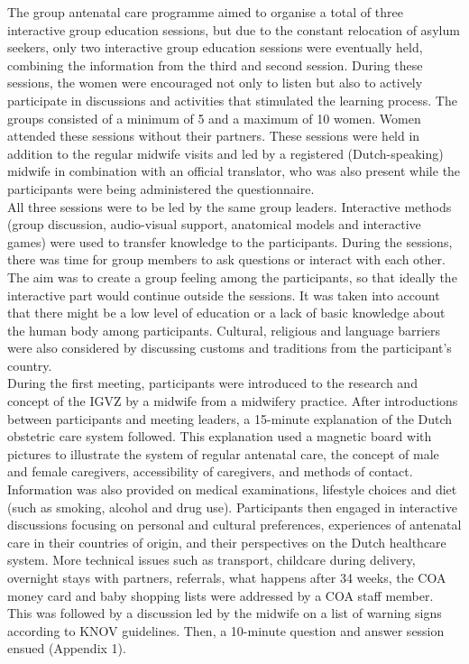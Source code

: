 \documentclass[12pt]{article}
\begin{document}
\noindent The group antenatal care programme aimed to organise a total of three interactive group education sessions, but due to the constant relocation of asylum seekers, only two interactive group education sessions were eventually held, combining the information from the third and second session. During these sessions, the women were encouraged not only to listen but also to actively participate in discussions and activities that stimulated the learning process. The groups consisted of a minimum of 5 and a maximum of 10 women. Women attended these sessions without their partners. These sessions were held in addition to the regular midwife visits and  led by a registered (Dutch-speaking) midwife in combination with an official translator, who was also present while the participants were being administered the questionnaire. \\

\noindent All three sessions were to be led by the same group leaders. Interactive methods (group discussion, audio-visual support, anatomical models and interactive games) were used to transfer knowledge to the participants. During the sessions, there was time for group members to ask questions or interact with each other. The aim was to create a group feeling among the participants, so that ideally the interactive part would continue outside the sessions. It was taken into account that there might be a low level of education or a lack of basic knowledge about the human body among participants. Cultural, religious and language barriers were also considered by discussing customs and traditions from the participant's country. \\

\noindent During the first meeting, participants were introduced to the research and concept of the IGVZ by a midwife from a midwifery practice. After introductions between participants and meeting leaders, a 15-minute explanation of the Dutch obstetric care system followed. This explanation used a magnetic board with pictures to illustrate the system of regular antenatal care, the concept of male and female caregivers, accessibility of caregivers, and methods of contact. Information was also provided on medical examinations, lifestyle choices and diet (such as smoking, alcohol and drug use). Participants then engaged in interactive discussions focusing on personal and cultural preferences, experiences of antenatal care in their countries of origin, and their perspectives on the Dutch healthcare system. More technical issues such as transport, childcare during delivery, overnight stays with partners, referrals, what happens after 34 weeks, the COA money card and baby shopping lists were addressed by a COA staff member. This was followed by a discussion led by the midwife on a list of warning signs according to KNOV guidelines. Then, a 10-minute question and answer session ensued (Appendix 1). \\
\end{document}
